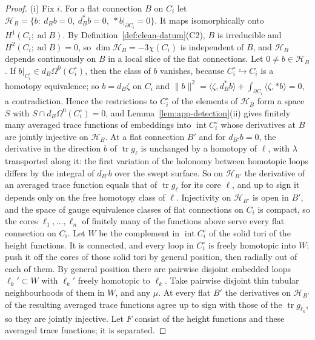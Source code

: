 \documentclass[11pt]{amsart}
\theoremstyle{definition}
\theoremstyle{remark}
\theoremstyle{plain}
\numberwithin{equation}{section}
\newcommand{\ad}{\operatorname{ad}}
\newcommand{\tr}{\operatorname{tr}}
\begin{document}
\begin{proof}
(i) Fix $i$. For a flat connection $B$ on $C_i$ let
$\mathcal H_B=\{b:\ d_Bb=0,\ d_B^*b=0,\ *b|_{\partial C_i}=0\}$. It maps isomorphically onto
$H^1(C_i;\ad B)$. By Definition~\ref{def:clean-datum}(C2), $B$ is irreducible and
$H^2(C_i;\ad B)=0$, so $\dim\mathcal H_B=-3\chi(C_i)$ is independent of $B$, and $\mathcal H_B$
depends continuously on $B$ in a local slice of the flat connections. Let $0\ne b\in\mathcal H_B$.
If $b|_{C_i^\circ}\in d_B\Omega^0(C_i^\circ)$, then the class of $b$ vanishes, because
$C_i^\circ\hookrightarrow C_i$ is a homotopy equivalence; so $b=d_B\zeta$ on $C_i$ and
$\|b\|^2=\langle\zeta,d_B^*b\rangle+\int_{\partial C_i}\langle\zeta,*b\rangle=0$, a contradiction.
Hence the restrictions to $C_i^\circ$ of the elements of $\mathcal H_B$ form a space $S$ with
$S\cap d_B\Omega^0(C_i^\circ)=0$, and Lemma~\ref{lem:app-detection}(ii) gives finitely many averaged
trace functions of embeddings into $\operatorname{int}C_i^\circ$ whose derivatives at $B$ are
jointly injective on $\mathcal H_B$. At a flat connection $B'$ and for $d_{B'}b=0$, the derivative in the direction $b$ of
$\tr g_\ell$ is unchanged by a homotopy of $\ell$, with $\lambda$ transported along it: the first
variation of the holonomy between homotopic loops differs by the integral of $d_{B'}b$ over the swept
surface. So on $\mathcal H_{B'}$ the derivative of an averaged trace function equals that of
$\tr g_\ell$ for its core $\ell$, and up to sign it depends only on the free homotopy class of
$\ell$. Injectivity on $\mathcal H_{B'}$ is open in $B'$, and the space of gauge equivalence classes
of flat connections on $C_i$ is compact, so the cores $\ell_1,\dots,\ell_n$ of finitely many of the
functions above serve every flat connection on $C_i$. Let $W$ be the complement in
$\operatorname{int}C_i^\circ$ of the solid tori of the height functions. It is connected, and every
loop in $C_i^\circ$ is freely homotopic into $W$: push it off the cores of those solid tori by
general position, then radially out of each of them. By general position there are pairwise
disjoint embedded loops $\ell_k'\subset W$ with $\ell_k'$ freely homotopic to $\ell_k$. Take pairwise
disjoint thin tubular neighbourhoods of them in $W$, and any $\mu$. At every flat $B'$ the
derivatives on $\mathcal H_{B'}$ of the resulting averaged trace functions agree up to sign with those
of the $\tr g_{\ell_k}$, so they are jointly injective. Let $F$ consist of the height functions and
these averaged trace functions; it is separated.


\end{proof}
\end{document}
